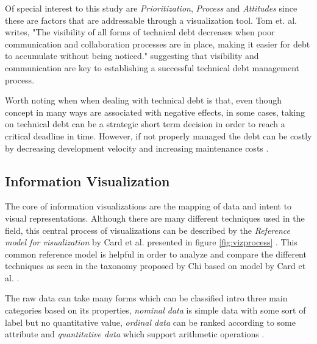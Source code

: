 Of special interest to this study are \textit{Prioritization}, \textit{Process} and \textit{Attitudes} since these are factors that are addressable through a visualization tool.
Tom et. al. writes, "The visibility of all forms of technical debt decreases when poor communication and collaboration processes are in place, making it easier for debt to accumulate without being noticed." \cite{tom_exploration_2013} suggesting that visibility and communication are key to establishing a successful technical debt management process.

Worth noting when when dealing with technical debt is that, even though concept in many ways are associated with negative effects, in some cases, taking on technical debt can be a strategic short term decision in order to reach a critical deadline in time.
However, if not properly managed the debt can be costly by decreasing development velocity and increasing maintenance costs \cite{seaman_using_2012}.

\subsection{Information Visualization}
The core of information visualizations are the mapping of data and intent to visual representations.
Although there are many different techniques used in the field, this central process of visualizations can be described by the \textit{Reference model for visualization} by Card et al. presented in figure \ref{fig:vizprocess} \cite{card_readings_1999}.
This common reference model is helpful in order to analyze and compare the different techniques as seen in the taxonomy proposed by Chi based on model by Card et al. \cite{chi_taxonomy_2000}.



The raw data can take many forms which can be classified intro three main categories based on its properties, \textit{nominal data} is simple data with some sort of label but no quantitative value, \textit{ordinal data} can be ranked according to some attribute and \textit{quantitative data} which support arithmetic operations \cite{card_structure_1997}.


